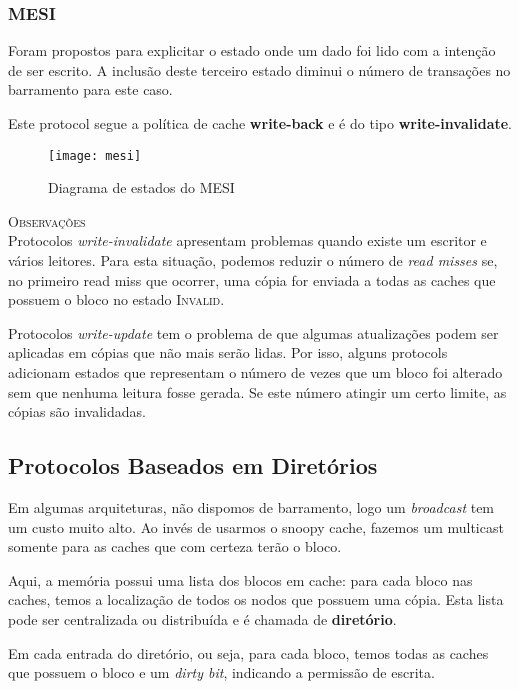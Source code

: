 \subsubsection{MESI}
Foram propostos para explicitar o estado onde um dado foi lido com a intenção de ser escrito. A inclusão deste terceiro estado diminui o número de transações no barramento para este caso.

Este protocol segue a política de cache \textbf{write-back} e é do tipo \textbf{write-invalidate}.

\begin{figure}[ht]
  \centering
  \texttt{[image: mesi]}
  \label{fig:mesi-automata}
  \caption{Diagrama de estados do MESI}
\end{figure}


\textsc{Observações}\\
Protocolos \textit{write-invalidate} apresentam problemas quando existe um escritor e vários leitores. Para esta situação, podemos reduzir o número de \textit{read misses} se, no primeiro read miss que ocorrer, uma cópia for enviada a todas as caches que possuem o bloco no estado \textsc{Invalid}.

Protocolos \textit{write-update} tem o problema de que algumas atualizações podem ser aplicadas em cópias que não mais serão lidas. Por isso, alguns protocols adicionam estados que representam o número de vezes que um bloco foi alterado sem que nenhuma leitura fosse gerada. Se este número atingir um certo limite, as cópias são invalidadas.




\subsection{Protocolos Baseados em Diretórios}
Em algumas arquiteturas, não dispomos de barramento, logo um \textit{broadcast} tem um custo muito alto. Ao invés de usarmos o snoopy cache, fazemos um multicast somente para as caches que com certeza terão o bloco.

Aqui, a memória possui uma lista dos blocos em cache: para cada bloco nas caches, temos a localização de todos os nodos que possuem uma cópia. Esta lista pode ser centralizada ou distribuída e é chamada de \textbf{diretório}.

Em cada entrada do diretório, ou seja, para cada bloco, temos todas as caches que possuem o bloco e um \textit{dirty bit}, indicando a permissão de escrita.




